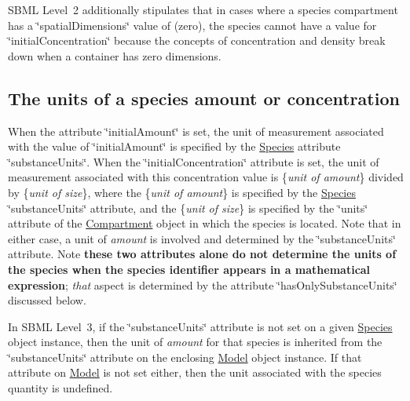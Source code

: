 S\+B\+ML Level~2 additionally stipulates that in cases where a species\textquotesingle{} compartment has a \char`\"{}spatial\+Dimensions\char`\"{} value of {} (zero), the species cannot have a value for \char`\"{}initial\+Concentration\char`\"{} because the concepts of concentration and density break down when a container has zero dimensions.\hypertarget{class_species_species-units}{}\subsection{The units of a species\textquotesingle{} amount or concentration}\label{class_species_species-units}
When the attribute \char`\"{}initial\+Amount\char`\"{} is set, the unit of measurement associated with the value of \char`\"{}initial\+Amount\char`\"{} is specified by the \hyperlink{class_species}{Species} attribute \char`\"{}substance\+Units\char`\"{}. When the \char`\"{}initial\+Concentration\char`\"{} attribute is set, the unit of measurement associated with this concentration value is \{{\itshape unit of amount}\} divided by \{{\itshape unit of size}\}, where the \{{\itshape unit of amount}\} is specified by the \hyperlink{class_species}{Species} \char`\"{}substance\+Units\char`\"{} attribute, and the \{{\itshape unit of size}\} is specified by the \char`\"{}units\char`\"{} attribute of the \hyperlink{class_compartment}{Compartment} object in which the species is located. Note that in either case, a unit of {\itshape amount} is involved and determined by the \char`\"{}substance\+Units\char`\"{} attribute. Note {\bfseries these two attributes alone do not determine the units of the species when the species identifier appears in a mathematical expression}; {\itshape that} aspect is determined by the attribute \char`\"{}has\+Only\+Substance\+Units\char`\"{} discussed below.

In S\+B\+ML Level~3, if the \char`\"{}substance\+Units\char`\"{} attribute is not set on a given \hyperlink{class_species}{Species} object instance, then the unit of {\itshape amount} for that species is inherited from the \char`\"{}substance\+Units\char`\"{} attribute on the enclosing \hyperlink{class_model}{Model} object instance. If that attribute on \hyperlink{class_model}{Model} is not set either, then the unit associated with the species\textquotesingle{} quantity is undefined.

